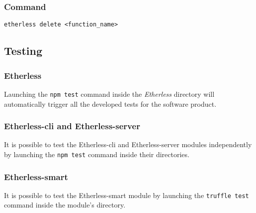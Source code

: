 	\subsubsection*{Command}
	\texttt{etherless delete <function\_name>}
\subsection{Testing}
\subsubsection{Etherless}
Launching the \texttt{npm test} command inside the \textit{Etherless} directory will automatically trigger all the developed tests for the software product.
\subsubsection{Etherless-cli and Etherless-server}
It is possible to test the Etherless-cli and Etherless-server modules independently by launching the \texttt{npm test} command inside their directories.
\subsubsection{Etherless-smart}
It is possible to test the Etherless-smart module by launching the \texttt{truffle test} command inside the module's directory.
